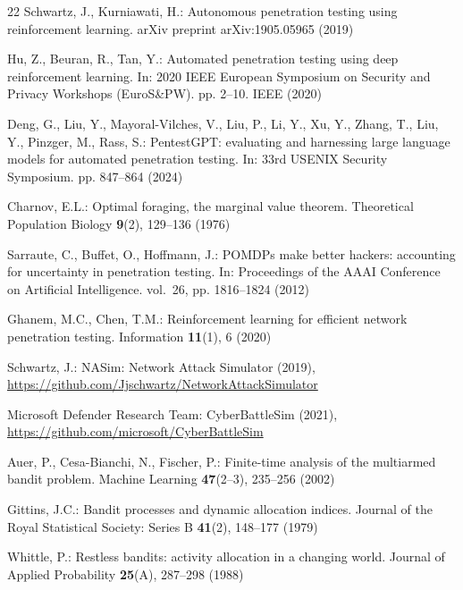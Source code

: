 \documentclass[runningheads]{llncs}
\begin{document}
\begin{thebibliography}{22}
Schwartz, J., Kurniawati, H.: Autonomous penetration testing using reinforcement learning. arXiv preprint arXiv:1905.05965 (2019)

Hu, Z., Beuran, R., Tan, Y.: Automated penetration testing using deep reinforcement learning. In: 2020 IEEE European Symposium on Security and Privacy Workshops (EuroS\&PW). pp. 2--10. IEEE (2020)

Deng, G., Liu, Y., Mayoral-Vilches, V., Liu, P., Li, Y., Xu, Y., Zhang, T., Liu, Y., Pinzger, M., Rass, S.: {PentestGPT}: evaluating and harnessing large language models for automated penetration testing. In: 33rd USENIX Security Symposium. pp. 847--864 (2024)

Charnov, E.L.: Optimal foraging, the marginal value theorem. Theoretical Population Biology \textbf{9}(2), 129--136 (1976)

Sarraute, C., Buffet, O., Hoffmann, J.: {POMDPs} make better hackers: accounting for uncertainty in penetration testing. In: Proceedings of the AAAI Conference on Artificial Intelligence. vol.~26, pp. 1816--1824 (2012)

Ghanem, M.C., Chen, T.M.: Reinforcement learning for efficient network penetration testing. Information \textbf{11}(1), 6 (2020)

Schwartz, J.: {NASim}: Network Attack Simulator (2019), \url{https://github.com/Jjschwartz/NetworkAttackSimulator}

Microsoft Defender Research Team: {CyberBattleSim} (2021), \url{https://github.com/microsoft/CyberBattleSim}

Auer, P., Cesa-Bianchi, N., Fischer, P.: Finite-time analysis of the multiarmed bandit problem. Machine Learning \textbf{47}(2--3), 235--256 (2002)

Gittins, J.C.: Bandit processes and dynamic allocation indices. Journal of the Royal Statistical Society: Series B \textbf{41}(2), 148--177 (1979)

Whittle, P.: Restless bandits: activity allocation in a changing world. Journal of Applied Probability \textbf{25}(A), 287--298 (1988)


\end{thebibliography}
\end{document}
